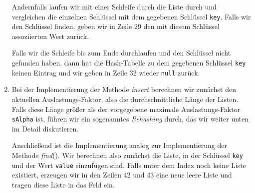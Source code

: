 \begin{enumerate}
      Andernfalls laufen wir mit einer Schleife durch die Liste durch und vergleichen 
      die einzelnen Schl\"ussel mit dem gegebenen Schl\"ussel \texttt{key}.
      Falls wir den Schl\"ussel finden, geben wir in Zeile 29 den mit diesem Schl\"ussel
      assoziierten Wert zur\"uck.

      Falls wir die Schleife bis zum Ende durchlaufen und den Schl\"ussel nicht gefunden
      haben, dann hat die Hash-Tabelle zu dem gegebenen Schl\"ussel \texttt{key} keinen
      Eintrag und wir geben in Zeile 32 wieder \texttt{null} zur\"uck.

\item Bei der Implementierung der Methode \textsl{insert} berechnen wir zun\"achst den
      aktuellen Auslastungs-Faktor, also die durchschnittliche L\"ange der Listen.  Falls diese L\"ange
      gr\"o{\ss}er als der vorgegebene maximale Auslastungs-Faktor \texttt{sAlpha} ist,
      f\"uhren wir ein sogenanntes \emph{Rehashing} durch, das wir weiter unten im Detail
      diskutieren.

      Anschlie{\ss}end ist die Implementierung analog zur Implementierung der Methode
      \textsl{find}().  Wir berechnen also zun\"achst die Liste, in der Schl\"ussel
      \texttt{key} und der Wert \texttt{value} einzuf\"ugen sind.  Falls unter dem Index
      noch keine Liste existiert, erzeugen wir in den Zeilen 42 und 43 eine neue leere
      Liste und tragen diese Liste in das Feld ein.  


\end{enumerate}
